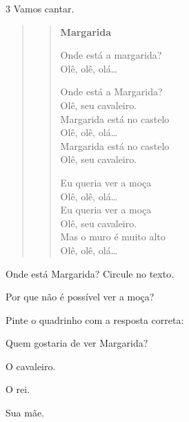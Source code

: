 \pagebreak
\num{3} Vamos cantar.


\begin{quote}
\begin{verse}
\textbf{Margarida}

Onde está a margarida?\\
Olê, olê, olá…

Onde está a Margarida?\\
Olê, seu cavaleiro.\\
Margarida está no castelo\\
Olê, olê, olá…\\
Margarida está no castelo\\
Olê, seu cavaleiro.

Eu queria ver a moça\\
Olê, olê, olá…\\
Eu queria ver a moça\\
Olê, seu cavaleiro.\\
Mas o muro é muito alto\\
Olê, olê, olá…
\end{verse}

\end{quote}

\begin{escolha}
\item Onde está Margarida? Circule no texto.

\item Por que não é possível ver a moça?


\item Pinte o quadrinho com a resposta correta:

Quem gostaria de ver Margarida?

\begin{multicols}{3}
\begin{boxlist}
 O cavaleiro.

 O rei.

 Sua mãe.
\end{boxlist}
\end{multicols}

\end{escolha}

